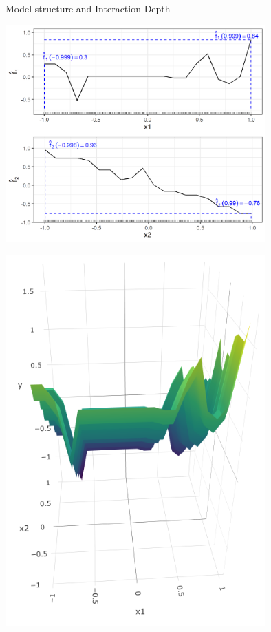 \begin{vbframe}{Model structure and Interaction Depth}
\begin{minipage}[c]{0.4\textwidth}
  \centering
  \includegraphics[width=0.75\textwidth]{
  figure_man/boosting_interaction_example_gam.png}
\end{minipage}%
\begin{minipage}[c]{0.3\textwidth}
  \centering
  \includegraphics[width=0.75\textwidth, trim = 0 60 0 50, clip]{
  figure_man/boosting_interaction_depth1fit3D_x1.png}
\end{minipage}%
\begin{minipage}[c]{0.3\textwidth}

\end{minipage}
\end{vbframe}

